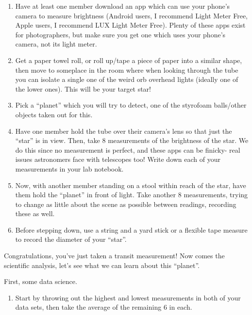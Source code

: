 \documentclass[11pt]{article}
\begin{document}
\begin{enumerate}
    \item Have at least one member download an app which can use your phone’s camera to measure brightness (Android users, I recommend Light Meter Free, Apple users, I recommend LUX Light Meter Free). Plenty of these apps exist for photographers, but make sure you get one which uses your phone’s camera, not its light meter.
    
    \item Get a paper towel roll, or roll up/tape a piece of paper into a similar shape, then move to someplace in the room where when looking through the tube you can isolate a single one of the weird orb overhead lights (ideally one of the lower ones). This will be your target star!
    
    \item Pick a “planet” which you will try to detect, one of the styrofoam balls/other objects taken out for this.
    
    \item Have one member hold the tube over their camera’s lens so that just the “star” is in view. Then, take 8 measurements of the brightness of the star. We do this since no measurement is perfect, and these apps can be finicky- real issues astronomers face with telescopes too! Write down each of your measurements in your lab notebook.
    
    \item Now, with another member standing on a stool within reach of the star, have them hold the “planet” in front of light. Take another 8 measurements, trying to change as little about the scene as possible between readings, recording these as well.
    
    \item Before stepping down, use a string and a yard stick or a flexible tape measure to record the diameter of your “star”.
\end{enumerate}

\noindent
Congratulations, you’ve just taken a transit measurement! Now comes the scientific analysis, let’s see what we can learn about this “planet”.

\medskip \noindent
First, some data science. 
\begin{enumerate}[resume]
    \item Start by throwing out the highest and lowest measurements in both of your data sets, then take the average of the remaining 6 in each.
\end{enumerate}
\end{document}
